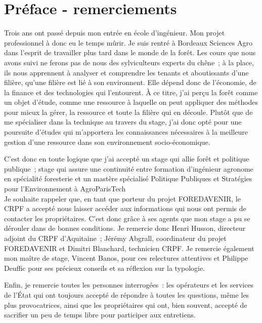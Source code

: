 \documentclass[12pt]{report}
\begin{document}
\chapter*{Préface - remerciements}

Trois ans ont passé depuis mon entrée en école d'ingénieur. Mon projet
professionnel à donc eu le temps mûrir. Je suis rentré à Bordeaux Sciences Agro
dans l'esprit de travailler plus tard dans le monde de la forêt. Les cours que
nous avons suivi ne ferons pas de nous des sylviculteurs experts du chêne~; à
la place, ils nous apprennent à analyser et comprendre les tenants et
aboutissants d'une filière, qu'une filière est lié à son environnent. Elle
dépend donc de l'économie, de la finance et des technologies qui l'entourent. À
ce titre, j'ai perçu la forêt comme un objet d'étude, comme une ressource à
laquelle on peut appliquer des méthodes pour mieux la gérer, la ressource et
toute la filière qui en découle. Plutôt que de me spécialiser dans la technique
au travers du stage, j'ai donc opté pour une poursuite d'études qui m'apportera
les connaissances nécessaires à la meilleure gestion d'une ressource dans son
environnement socio-économique.

C'est donc en toute logique que j'ai accepté un stage qui allie forêt et
politique publique~; stage qui assure une continuité entre formation d'ingénieur
agronome en spécialité foresterie et un mastère spécialisé Politique Publiques
et Stratégies pour l'Environnement à AgroParisTech\\

Je souhaite rappeler que, en tant que porteur du projet FOREDAVENIR, le CRPF a
accepté nous laisser accéder aux informations qui nous ont permis de contacter les
propriétaires. C'est donc grâce à ses agents que mon stage a pu se dérouler dans de
bonnes conditions. Je remercie donc Henri Husson, directeur adjoint du CRPF
d'Aquitaine~; Jérémy Abgrall, coordinateur du projet FOREDAVENIR et Dimitri
Blanchard, technicien CRPF. Je remercie également mon maître de stage, Vincent
Banos, pour ces relectures attentives et Philippe Deuffic pour ses précieux
conseils et sa réflexion sur la typologie.

Enfin, je remercie toutes les personnes interrogées~: les opérateurs et les
services de l'État qui ont toujours accepté de répondre à toutes les questions,
même les plus provocatrices, ainsi
que les propriétaires qui ont, bien souvent, accepté de sacrifier un peu de
temps libre pour participer aux entretiens. 
\end{document}

